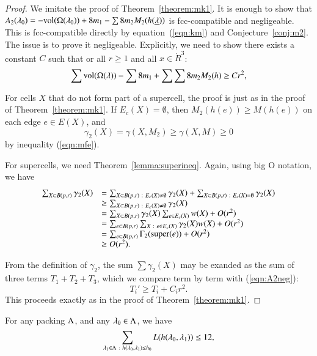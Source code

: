 \begin{proof}  We imitate the proof of Theorem~\ref{theorem:mk1}.
It is enough to show that $A_2(\lambda_0)  = -{\operatorname{vol}}(\Omega(\lambda_0)) + 8 m_1 - \sum 8 m_2 M_2(h({\underline{\lambda}}))$ is fcc-compatible and negligeable. 
This is fcc-compatible directly
by equation~(\ref{eqn:km})
and Conjecture~\ref{conj:m2}.  The issue is to prove it negligeable.  Explicitly, we need
to show there exists a constant  $C$ such that or all $r\ge 1$ and all $x\in\ring{R}^3$:
\begin{equation}\label{eqn:A2neg}
  \sum {\operatorname{vol}}(\Omega(\lambda)) -\sum 8m_1 + \sum \sum 8 m_2 M_2(h) \ge C r^2,
\end{equation}

For cells $X$ that do not form part of a supercell,
the proof is just as in the proof of Theorem~\ref{theorem:mk1}.
If $E_c(X)=\emptyset$, then 
$M_2(h(e))\ge M(h(e))$ on each edge $e\in E(X)$, and
$$\gamma_2(X)=\gamma(X,M_2)\ge \gamma(X,M)\ge 0$$ 
by inequality (\ref{eqn:mfe}).

For supercells, we need Theorem~\ref{lemma:superineq}.
Again, using big O notation, we have
$$
\begin{array}{lll}
\sum_{X\subset B(p,r)} \gamma_2(X) &= 
\sum_{X\subset B(p,r)\ :\  E_c(X)\ne\emptyset} \gamma_2(X) +
\sum_{X\subset B(p,r)\ :\  E_c(X)=\emptyset} \gamma_2(X) \\
&\ge \sum_{X\subset B(p,r)\ :\  E_c(X)\ne\emptyset} \gamma_2(X) \\
&=\sum_{X\subset B(p,r)}\gamma_2(X)\sum_{e \in E_c(X)}w(X) + O(r^2)\\
&=\sum_{e\subset B(p,r)}\sum_{X\ :\  e \in E_c(X)}\gamma_2(X)w(X) + O(r^2)\\
&=\sum_{e\subset B(p,r)}\Gamma_2({\operatorname{super}}(e)) + O(r^2)\\
&\ge O(r^2).
\end{array}
$$

From the definition of $\gamma_2$, the sum $\sum \gamma_2(X)$ may be exanded as the sum of three terms $T_1+T_2+T_3$, which we compare term by term with (\ref{eqn:A2neg}):
$$
T_i' \ge T_i + C_i r^2.
$$
This proceeds exactly as in the proof of Theorem~\ref{theorem:mk1}.
\end{proof}



\begin{conjecture} \label{conj:L12} 
For any packing $\Lambda$, and
any $\lambda_0\in\Lambda$, we have
\begin{equation}\label{eqn:L12}
\sum_{\lambda_1\in\Lambda\ :\  h(\lambda_0,\lambda_1)\le {h_0}} L(h(\lambda_0,\lambda_1)) \le 12,
\end{equation}
\end{conjecture}

